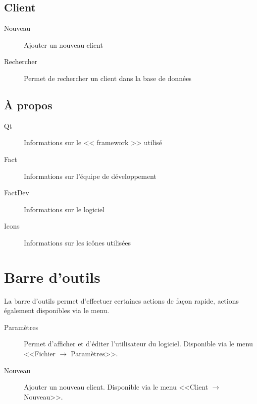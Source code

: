 \subsection{Client}
\begin{description}
	\item[Nouveau] Ajouter un nouveau client
	\item[Rechercher] Permet de rechercher un client dans la base de données
\end{description}
\subsection{À propos}
\begin{description}
	\item[Qt] Informations sur le << framework >> utilisé
	\item[Fact] Informations sur l'équipe de développement
	\item[FactDev]Informations sur le logiciel
	\item[Icons] Informations sur les icônes utilisées
\end{description}
\section{Barre d'outils}
La barre d’outils permet d’effectuer certaines actions de façon rapide, actions également disponibles via le menu.

\begin{description}
	\item[Paramètres] Permet d'afficher et d’éditer l'utilisateur du logiciel. Disponible via le menu <<Fichier $\rightarrow$ Paramètres>>.
	\item[Nouveau] Ajouter un nouveau client. Disponible via le menu <<Client $\rightarrow$ Nouveau>>.
\end{description}

